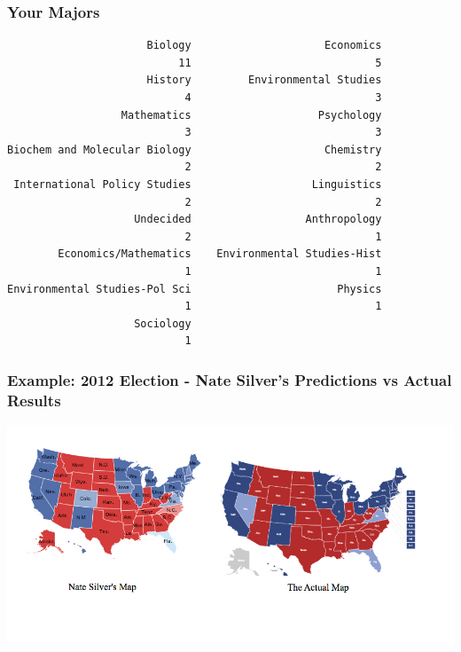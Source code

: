 \documentclass[slides]{beamer}
\begin{document}
\begin{frame}[fragile]
\frametitle{Your Majors}
\begin{small}
\begin{verbatim}
                      Biology                     Economics 
                           11                             5 
                      History         Environmental Studies 
                            4                             3 
                  Mathematics                    Psychology 
                            3                             3 
Biochem and Molecular Biology                     Chemistry 
                            2                             2 
 International Policy Studies                   Linguistics 
                            2                             2 
                    Undecided                  Anthropology 
                            2                             1 
        Economics/Mathematics    Environmental Studies-Hist 
                            1                             1 
Environmental Studies-Pol Sci                       Physics 
                            1                             1 
                    Sociology 
                            1 
\end{verbatim}
\end{small}
\end{frame}


\begin{frame}[fragile]
\frametitle{Example: 2012 Election - Nate Silver's Predictions vs Actual Results}
\begin{center}
\includegraphics[width=\textwidth]{figure/nate_silver.jpg}
\end{center}
\begin{center}
\end{center}
\end{frame}
\end{document}
